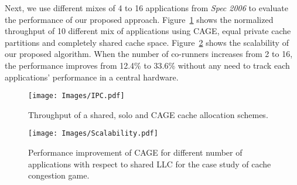 \indent Next, we use different mixes of 4 to 16 applications from \textit{Spec 2006} to evaluate the performance of our proposed approach. Figure~\ref{fig:IPC_mix} shows the normalized throughput of 10 different mix of applications using CAGE, equal private cache partitions and completely shared cache space. Figure~\ref{fig:scalability} shows the scalability of our proposed algorithm. When the number of co-runners increases from 2 to 16, the performance improves from 12.4\% to 33.6\% without any need to track each applications' performance in a central hardware. 
\begin{figure}[!tb]
\centering
\texttt{[image: Images/IPC.pdf]}
\caption{Throughput of a shared, solo and CAGE cache allocation schemes.}
\label{fig:IPC_mix}
\end{figure}
\begin{figure}[!tb]
\centering
\texttt{[image: Images/Scalability.pdf]}
\caption{Performance improvement of CAGE for different number of applications with respect to shared LLC for the case study of cache congestion game.}
\label{fig:scalability}
\end{figure}
